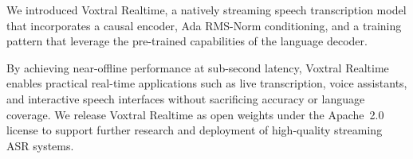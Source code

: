 We introduced Voxtral Realtime, a natively streaming speech transcription model that incorporates a causal encoder, Ada RMS-Norm conditioning, and a training pattern that leverage the pre-trained capabilities of the language decoder.

By achieving near-offline performance at sub-second latency, Voxtral Realtime enables practical real-time applications such as live transcription, voice assistants, and interactive speech interfaces without sacrificing accuracy or language coverage. We release Voxtral Realtime as open weights under the Apache~2.0 license to support further research and deployment of high-quality streaming ASR systems.